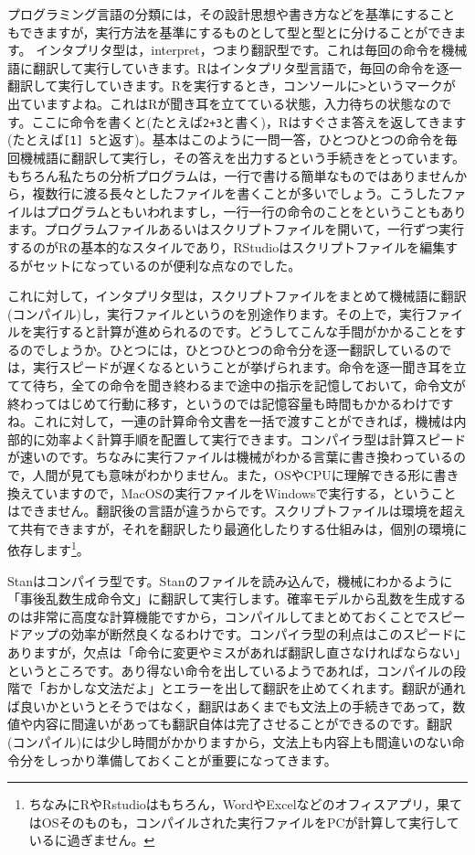 \documentclass{ltjsbook}
\begin{document}
プログラミング言語の分類には，その設計思想や書き方などを基準にすることもできますが，実行方法を基準にするものとして型と型とに分けることができます。
インタプリタ型は，interpret，つまり翻訳型です。これは毎回の命令を機械語に翻訳して実行していきます。Rはインタプリタ型言語で，毎回の命令を逐一翻訳して実行していきます。Rを実行するとき，コンソールに\verb|>|というマークが出ていますよね。これはRが聞き耳を立てている状態，入力待ちの状態なのです。ここに命令を書くと(たとえば\verb|2+3|と書く)，Rはすぐさま答えを返してきます(たとえば\verb|[1] 5|と返す)。基本はこのように一問一答，ひとつひとつの命令を毎回機械語に翻訳して実行し，その答えを出力するという手続きをとっています。もちろん私たちの分析プログラムは，一行で書ける簡単なものではありませんから，複数行に渡る長々としたファイルを書くことが多いでしょう。こうしたファイルはプログラムともいわれますし，一行一行の命令のことをということもあります。プログラムファイルあるいはスクリプトファイルを開いて，一行ずつ実行するのがRの基本的なスタイルであり，RStudioはスクリプトファイルを編集するがセットになっているのが便利な点なのでした。

これに対して，インタプリタ型は，スクリプトファイルをまとめて機械語に翻訳(コンパイル)し，実行ファイルというのを別途作ります。その上で，実行ファイルを実行すると計算が進められるのです。どうしてこんな手間がかかることをするのでしょうか。ひとつには，ひとつひとつの命令分を逐一翻訳しているのでは，実行スピードが遅くなるということが挙げられます。命令を逐一聞き耳を立てて待ち，全ての命令を聞き終わるまで途中の指示を記憶しておいて，命令文が終わってはじめて行動に移す，というのでは記憶容量も時間もかかるわけですね。これに対して，一連の計算命令文書を一括で渡すことができれば，機械は内部的に効率よく計算手順を配置して実行できます。コンパイラ型は計算スピードが速いのです。ちなみに実行ファイルは機械がわかる言葉に書き換わっているので，人間が見ても意味がわかりません。また，OSやCPUに理解できる形に書き換えていますので，MacOSの実行ファイルをWindowsで実行する，ということはできません。翻訳後の言語が違うからです。スクリプトファイルは環境を超えて共有できますが，それを翻訳したり最適化したりする仕組みは，個別の環境に依存します\footnote{ちなみにRやRstudioはもちろん，WordやExcelなどのオフィスアプリ，果てはOSそのものも，コンパイルされた実行ファイルをPCが計算して実行しているに過ぎません。}。

Stanはコンパイラ型です。Stanのファイルを読み込んで，機械にわかるように「事後乱数生成命令文」に翻訳して実行します。確率モデルから乱数を生成するのは非常に高度な計算機能ですから，コンパイルしてまとめておくことでスピードアップの効率が断然良くなるわけです。コンパイラ型の利点はこのスピードにありますが，欠点は「命令に変更やミスがあれば翻訳し直さなければならない」というところです。あり得ない命令を出しているようであれば，コンパイルの段階で「おかしな文法だよ」とエラーを出して翻訳を止めてくれます。翻訳が通れば良いかというとそうではなく，翻訳はあくまでも文法上の手続きであって，数値や内容に間違いがあっても翻訳自体は完了させることができるのです。翻訳(コンパイル)には少し時間がかかりますから，文法上も内容上も間違いのない命令分をしっかり準備しておくことが重要になってきます。
\end{document}
